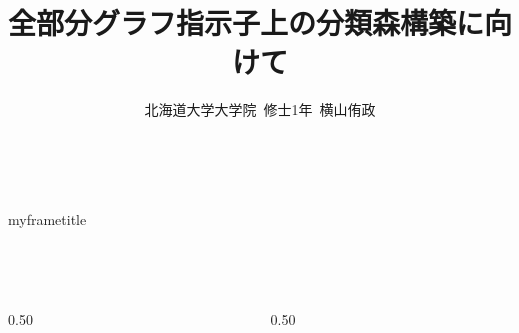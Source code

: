 \documentclass{beamer}           %
\title{全部分グラフ指示子上の分類森構築に向けて}
\author{北海道大学大学院~修士1年~横山侑政}
\begin{document}
~ \\
\vspace{10px}
\begin{beamercolorbox}[
    wd=\hsize,
    sep=32pt,     %
]{myframetitle}
\begin{center}
	{\Huge \inserttitle} \\
	\medskip
	\medskip
	{\huge \insertauthor} \\
\end{center}
\end{beamercolorbox}

\begin{columns}[T]
	\begin{column}{0.50\hsize}
		
		
	\end{column}
	\begin{column}{0.50\hsize}
		
		
		
	\end{column}
\end{columns}
\end{document}
